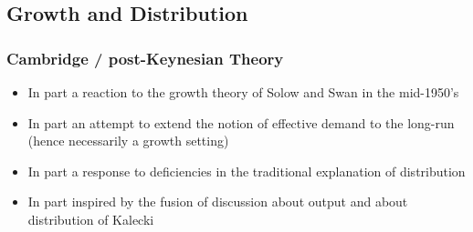 \documentclass{article}
\begin{document}
\subsection{Growth and Distribution}
\subsubsection{Cambridge / post-Keynesian Theory}
	\begin{itemize}
		\item In part a reaction to the growth theory of Solow and Swan in the mid-1950's
		\item In part an attempt to extend the notion of effective demand to the long-run (hence necessarily a growth setting)
		\item In part a response to deficiencies in the traditional explanation of distribution
		\item In part inspired by the fusion of discussion about output and about distribution of Kalecki
	\end{itemize}
\end{document}
